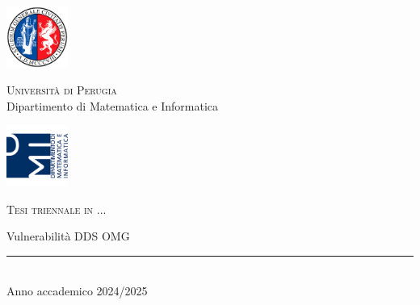 \thispagestyle{empty} %

	\noindent %
	\includegraphics[width=0.15\textwidth]{img/logoUniPg}
	\begin{minipage}[b]{0.7\textwidth}
		\centering
		{\Large \textcolor{blu_dmi}{\textsc{Universit{\`a} di Perugia}}}\\
		\vspace{0.4 em}
		{\large \textcolor{blu_dmi}{Dipartimento di Matematica e Informatica}}
		\vspace{0.6 em}
	\end{minipage}%
	\includegraphics[width=0.15\textwidth]{img/logoDMI}
	
	\vspace{5 em}

	\begin{center}
		
		{\large \textcolor{blu_dmi}{\textsc{Tesi triennale in ...}}}
		\vspace{8 em}
		
		{\Huge \textcolor{blu_dmi}{Vulnerabilità DDS OMG}}
		\vspace{10 em}
		
		
		\vspace{6 em}
		\vfill
		
		\textcolor{blu_dmi}{\rule{380pt}{.4pt}}\\
		\vspace{1.2 em}
		\large{\textcolor{blu_dmi}{Anno accademico 2024/2025}}
		
		
		
		
	\end{center}

